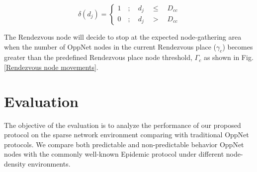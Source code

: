 \[\delta \left( { d }_{ j } \right) =\begin{cases} 1\quad ;\quad { d }_{ j }\quad \le { \quad D }_{ cc } \\ 0\quad ;\quad { d }_{ j }\quad >{ \quad D }_{ cc } \end{cases}  \] 

The Rendezvous node will decide to stop at the expected node-gathering area when the number of OppNet nodes in the current Rendezvous place ($\gamma_{c}$) becomes greater than the predefined Rendezvous place node threshold, $\Gamma_{c}$ as shown in Fig. \ref{Rendezvous node movements}.  
\section{Evaluation}
\label{DRRA:Evaluation}
The objective of the evaluation is to analyze the performance of our proposed protocol on the sparse network environment comparing with traditional OppNet protocols.
%
We compare both predictable and non-predictable behavior OppNet nodes with the commonly well-known Epidemic protocol\cite{Vahdat2000} under different node-density environments.

